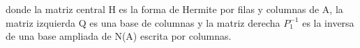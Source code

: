 \documentclass[11pt, a4paper]{article}
\newif\IfInSansMode
\theoremstyle{theorem-style}
\theoremstyle{definition-style}
\theoremstyle{remark-style}
\theoremstyle{example-style}
\begin{document}
donde la matriz central H es la forma de Hermite por filas y columnas de A, la matriz izquierda Q es una base de columnas y la matriz derecha $P_1^{-1}$ es la inversa de una base ampliada de N(A) escrita por columnas.











\end{document}
